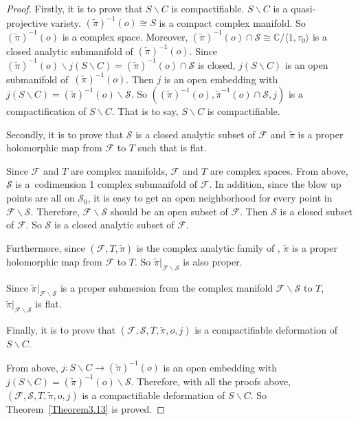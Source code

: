 \documentclass[pdftex]{sigma}
\numberwithin{equation}{section}
\begin{document}
\begin{proof}
Firstly, it is to prove that $S\backslash C$ is compactifiable.
$S\backslash C$ is a quasi-projective variety. $(\widetilde{\pi})^{-1}(o)\cong S$ is a compact complex manifold. So $(\widetilde{\pi})^{-1}(o)$ is a complex space. Moreover, $(\widetilde{\pi})^{-1}(o)\cap \mathcal{S}\cong \mathbb{C}/\langle 1, \tau_0 \rangle$ is a closed analytic submanifold of $(\widetilde{\pi})^{-1}(o)$. Since $(\widetilde{\pi})^{-1}(o)\backslash j(S\backslash C)=(\widetilde{\pi})^{-1}(o)\cap \mathcal{S}$ is closed, $j(S\backslash C)$ is an open submanifold of~$(\widetilde{\pi})^{-1}(o)$. Then $j$ is an open embedding with $j(S\backslash C)=(\widetilde{\pi})^{-1}(o)\backslash \mathcal{S}$. So $((\widetilde{\pi})^{-1}(o),\widetilde{\pi}^{-1}(o)\cap \mathcal{S},j)$ is a compactification of $S\backslash C$. That is to say, $S\backslash C$ is compactifiable.

Secondly, it is to prove that $\mathcal{S}$ is a closed analytic subset of $\mathcal{F}$ and $\widetilde{\pi}$ is a proper holomorphic map from $\mathcal{F}$ to $T$ such that  is flat.

Since $\mathcal{F}$ and $T$ are complex manifolds, $\mathcal{F}$ and $T$ are complex spaces. From above, $\mathcal{S}$ is a~codimension 1 complex submanifold of $\mathcal{F}$. In addition, since the blow up points are all on $\mathcal{S}_0$, it is easy to get an open neighborhood for every point in $\mathcal{F}\backslash \mathcal{S}$. Therefore, $\mathcal{F}\backslash \mathcal{S}$ should be an open subset of $\mathcal{F}$. Then $\mathcal{S}$ is a closed subset of $\mathcal{F}$. So $\mathcal{S}$ is a closed analytic subset of $\mathcal{F}$.

Furthermore, since $(\mathcal{F},T,\widetilde{\pi})$ is the complex analytic family of , $\widetilde{\pi}$ is a proper holomorphic map from $\mathcal{F}$ to $T$. So $\widetilde{\pi}|_{\mathcal{F}\backslash \mathcal{S}}$ is also proper.

Since $\widetilde{\pi}|_{\mathcal{F}\backslash \mathcal{S}}$ is a proper submersion from the complex manifold $\mathcal{F}\backslash \mathcal{S}$ to $T$, $\widetilde{\pi}|_{\mathcal{F}\backslash \mathcal{S}}$ is flat.

Finally, it is to prove that $(\mathcal{F},\mathcal{S},T,\widetilde{\pi},o,j)$ is a compactifiable deformation of $S\backslash C$.

From above, $j\colon S\backslash C \rightarrow (\widetilde{\pi})^{-1}(o)$ is an open embedding with $j(S\backslash C)=(\widetilde{\pi})^{-1}(o)\backslash \mathcal{S}$. Therefore, with all the proofs above, $(\mathcal{F},\mathcal{S},T,\widetilde{\pi},o,j)$ is a compactifiable deformation of $S\backslash C$. So Theorem~\ref{Theorem3.13} is proved.
\end{proof}
\end{document}
